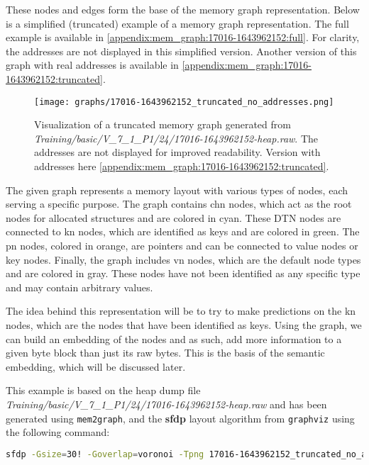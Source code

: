 These nodes and edges form the base of the memory graph representation. Below is a simplified (truncated) example of a memory graph representation. The full example is available in \ref{appendix:mem_graph:17016-1643962152:full}. For clarity, the addresses are not displayed in this simplified version. Another version of this graph with real addresses is available in \ref{appendix:mem_graph:17016-1643962152:truncated}.

\begin{figure}[H]\label{methods:mem_graph:17016-1643962152:simplified}
    \centering
    \texttt{[image: graphs/17016-1643962152\_truncated\_no\_addresses.png]}
    \caption{Visualization of a truncated memory graph generated from \textit{Training/basic/V\_7\_1\_P1/24/17016-1643962152-heap.raw}. The addresses are not displayed for improved readability. Version with addresses here \ref{appendix:mem_graph:17016-1643962152:truncated}.}
\end{figure}

The given graph represents a memory layout with various types of nodes, each serving a specific purpose. The graph contains \gls{chn} nodes, which act as the root nodes for allocated structures and are colored in cyan. These DTN nodes are connected to \gls{kn} nodes, which are identified as keys and are colored in green. The \gls{pn} nodes, colored in orange, are pointers and can be connected to value nodes or key nodes. Finally, the graph includes \gls{vn} nodes, which are the default node types and are colored in gray. These nodes have not been identified as any specific type and may contain arbitrary values.

The idea behind this representation will be to try to make predictions on the \gls{kn} nodes, which are the nodes that have been identified as keys. Using the graph, we can build an embedding of the nodes and as such, add more information to a given byte block than just its raw bytes. This is the basis of the semantic embedding, which will be discussed later.

This example is based on the heap dump file \textit{Training/basic/V\_7\_1\_P1/24/17016-1643962152-heap.raw} and has been generated using \texttt{mem2graph}, and the \textbf{sfdp} layout algorithm from \texttt{graphviz} using the following command:

\begin{lstlisting}[language=bash, caption={Command used to generate the memory graph visualization of \textit{Training/basic/V\_7\_1\_P1/24/17016-1643962152-heap.raw}}]
    sfdp -Gsize=30! -Goverlap=voronoi -Tpng 17016-1643962152_truncated_no_addresses.gv > 17016-1643962152_truncated_no_addresses.png
\end{lstlisting}

